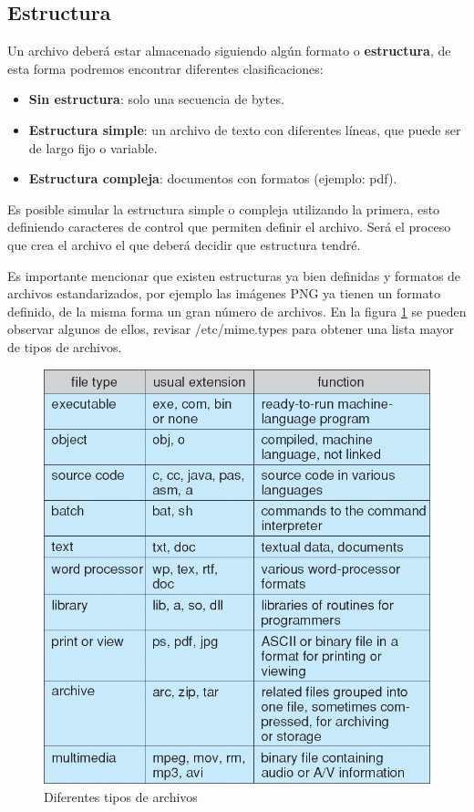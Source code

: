 \subsection{Estructura}
Un archivo deberá estar almacenado siguiendo algún formato o
\textbf{estructura}, de esta forma podremos encontrar diferentes
clasificaciones:

\begin{itemize}
	\item \textbf{Sin estructura}: solo una secuencia de bytes.
	\item \textbf{Estructura simple}: un archivo de texto con diferentes líneas, que puede ser de largo fijo o variable.
	\item \textbf{Estructura compleja}: documentos con formatos (ejemplo: pdf).
\end{itemize}

Es posible simular la estructura simple o compleja utilizando la primera, esto
definiendo caracteres de control que permiten definir el archivo. Será el
proceso que crea el archivo el que deberá decidir que estructura tendré.

Es importante mencionar que existen estructuras ya bien definidas y formatos de archivos estandarizados, por ejemplo las imágenes PNG ya tienen un formato definido, de la misma forma un gran número de archivos. En la figura \ref{fig:archivos_tipos} se pueden observar algunos de ellos, revisar /etc/mime.types para obtener una lista mayor de tipos de archivos.

\begin{figure}[htbp]
\centering
\includegraphics[scale=0.7]{img/C08_disco/tipos.png}
\caption{Diferentes tipos de archivos}
\label{fig:archivos_tipos}
\end{figure}


